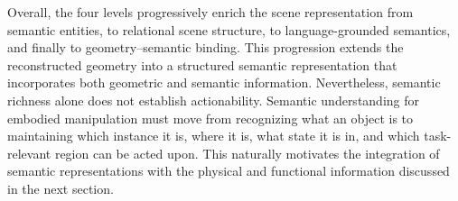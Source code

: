 \documentclass{SCIS2026}
\begin{document}
Overall, the four levels progressively enrich the scene representation from semantic entities, to relational scene structure, to language-grounded semantics, and finally to geometry--semantic binding. This progression extends the reconstructed geometry into a structured semantic representation that incorporates both geometric and semantic information. Nevertheless, semantic richness alone does not establish actionability. Semantic understanding for embodied manipulation must move from recognizing what an object is to maintaining which instance it is, where it is, what state it is in, and which task-relevant region can be acted upon. This naturally motivates the integration of semantic representations with the physical and functional information discussed in the next section.




\newcommand{\CenterCellB}[1]{%
\begin{minipage}[t][2.55cm][t]{\linewidth}
\centering
\vspace{0.05cm}
#1
\end{minipage}%
}

\newcommand{\LeftCellB}[1]{%
\begin{minipage}[t][2.55cm][t]{\linewidth}
\raggedright
\vspace{0.05cm}
#1
\end{minipage}%
}

\newcommand{\CategoryCellB}[1]{%
\begin{minipage}[c]{\linewidth}
\raggedright
\setlength{\parindent}{0pt}%
\vspace*{1pt}
\noindent\ignorespaces#1\unskip\par
\vspace*{1pt}
\end{minipage}%
}

\newcommand{\strengthB}[1]{%
\textcolor{BlueText}{\textbf{Strength: }}#1%
}

\newcommand{\limitationB}[1]{%
\textcolor{GreenText}{\textbf{Limitation: }}#1%
}


\end{document}
